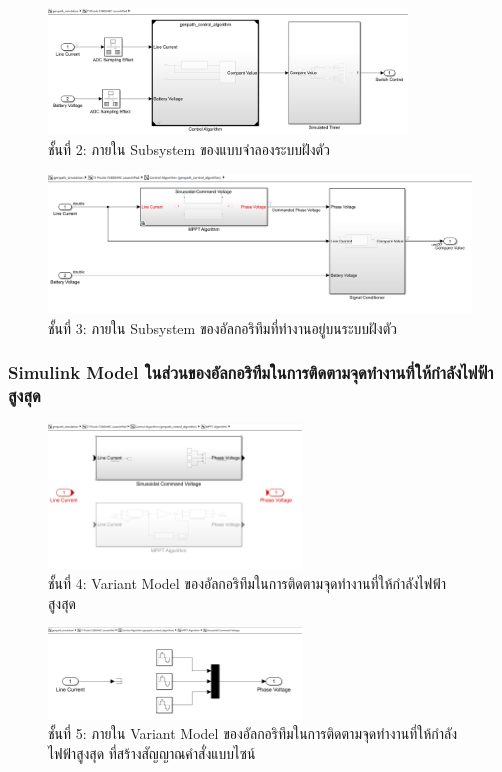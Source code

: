 \documentclass[11pt,a4paper]{article}
\begin{document}
\begin{figure}[H]
    \centering
    \includegraphics[width=0.85\textwidth]{l2-embed.png}
    \caption{ชั้นที่ 2: ภายใน Subsystem ของแบบจำลองระบบฝังตัว}
\end{figure}

\begin{figure}[H]
    \centering
    \includegraphics[width=\textwidth]{l3-control-algo.png}
    \caption{ชั้นที่ 3: ภายใน Subsystem ของอัลกอริทึมที่ทำงานอยู่บนระบบฝังตัว}
\end{figure}

\subsubsection{Simulink Model ในส่วนของอัลกอริทึมในการติดตามจุดทำงานที่ให้กำลังไฟฟ้าสูงสุด}

\begin{figure}[H]
    \centering
    \includegraphics[width=0.6\textwidth]{l4-mppt.png}
    \caption{ชั้นที่ 4: Variant Model ของอัลกอริทึมในการติดตามจุดทำงานที่ให้กำลังไฟฟ้าสูงสุด}
\end{figure}

\begin{figure}[H]
    \centering
    \includegraphics[width=0.6\textwidth]{l5-sin.png}
    \caption{ชั้นที่ 5: ภายใน Variant Model ของอัลกอริทึมในการติดตามจุดทำงานที่ให้กำลังไฟฟ้าสูงสุด ที่สร้างสัญญาณคำสั่งแบบไซน์}
\end{figure}
\end{document}
